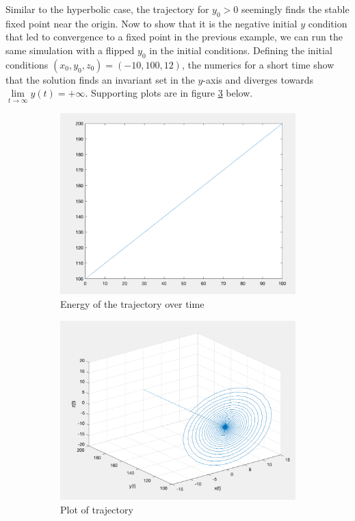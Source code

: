 \documentclass[11pt]{article}
\begin{document}
Similar to the hyperbolic case, the trajectory for $y_0 > 0$ seemingly finds the stable fixed point near the origin. Now to show that it is the negative initial $y$ condition that led to convergence to a fixed point in the previous example, we can run the same simulation with a flipped $y_0$ in the initial conditions. Defining the initial conditions $(x_0, y_0, z_0) = (-10, 100, 12)$, the numerics for a short time show that the solution finds an invariant set in the $y$-axis and diverges towards $\underset{t \rightarrow \infty}{\lim}y(t) = +\infty$. Supporting plots are in figure \ref{fig:new3} below.


\begin{figure}[h!]
\centering
\begin{subfigure}{0.5\textwidth}
  \centering
  \includegraphics[width=0.93\linewidth]{new3e.png}
  \caption{Energy of the trajectory over time}
  \label{}
\end{subfigure}%
\begin{subfigure}{0.5\textwidth}
  \centering
  \includegraphics[width=0.93\linewidth]{new3p.png}
  \caption{Plot of trajectory}
  \label{}
\end{subfigure}
\caption{}
\label{fig:new3}
\end{figure}
\end{document}
